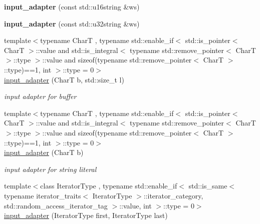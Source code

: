 \begin{DoxyCompactItemize}
{\bfseries input\+\_\+adapter} (const std\+::u16string \&ws)
\item 
\mbox{\label{classnlohmann_1_1detail_1_1input__adapter_abe0015ae09e855f502620315b9dcc3db}} 
{\bfseries input\+\_\+adapter} (const std\+::u32string \&ws)
\item 
\mbox{\label{classnlohmann_1_1detail_1_1input__adapter_a37816622d79ab4a1a76f4d7e872b65e1}} 
{\footnotesize template$<$typename CharT , typename std\+::enable\+\_\+if$<$ std\+::is\+\_\+pointer$<$ Char\+T $>$\+::value and std\+::is\+\_\+integral$<$ typename std\+::remove\+\_\+pointer$<$ Char\+T $>$\+::type $>$\+::value and sizeof(typename std\+::remove\+\_\+pointer$<$ Char\+T $>$\+::type)==1, int $>$\+::type  = 0$>$ }\\\hyperlink{classnlohmann_1_1detail_1_1input__adapter_a37816622d79ab4a1a76f4d7e872b65e1}{input\+\_\+adapter} (CharT b, std\+::size\+\_\+t l)
\begin{DoxyCompactList}\small\item\em input adapter for buffer \end{DoxyCompactList}\item 
\mbox{\label{classnlohmann_1_1detail_1_1input__adapter_a86f035d9c4319360014b922b5e433ced}} 
{\footnotesize template$<$typename CharT , typename std\+::enable\+\_\+if$<$ std\+::is\+\_\+pointer$<$ Char\+T $>$\+::value and std\+::is\+\_\+integral$<$ typename std\+::remove\+\_\+pointer$<$ Char\+T $>$\+::type $>$\+::value and sizeof(typename std\+::remove\+\_\+pointer$<$ Char\+T $>$\+::type)==1, int $>$\+::type  = 0$>$ }\\\hyperlink{classnlohmann_1_1detail_1_1input__adapter_a86f035d9c4319360014b922b5e433ced}{input\+\_\+adapter} (CharT b)
\begin{DoxyCompactList}\small\item\em input adapter for string literal \end{DoxyCompactList}\item 
\mbox{\label{classnlohmann_1_1detail_1_1input__adapter_ad6824b0f792691f75186c527fa31a6b4}} 
{\footnotesize template$<$class Iterator\+Type , typename std\+::enable\+\_\+if$<$ std\+::is\+\_\+same$<$ typename iterator\+\_\+traits$<$ Iterator\+Type $>$\+::iterator\+\_\+category, std\+::random\+\_\+access\+\_\+iterator\+\_\+tag $>$\+::value, int $>$\+::type  = 0$>$ }\\\hyperlink{classnlohmann_1_1detail_1_1input__adapter_ad6824b0f792691f75186c527fa31a6b4}{input\+\_\+adapter} (Iterator\+Type first, Iterator\+Type last)

\end{DoxyCompactItemize}
